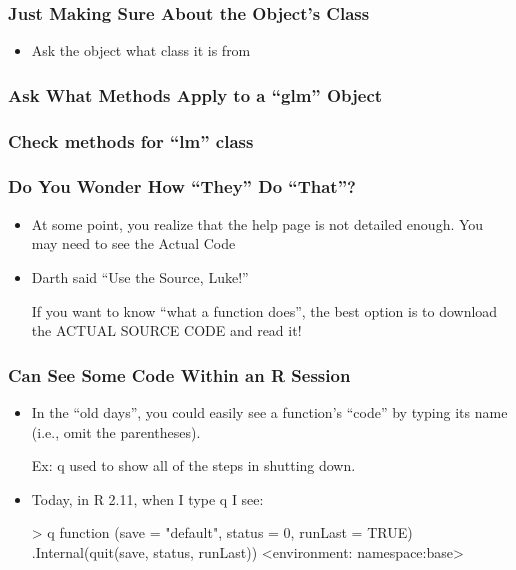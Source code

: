 \documentclass[10pt,english]{beamer}
\begin{document}
\begin{frame}[containsverbatim]
  \frametitle{Just Making Sure About the Object's Class}

  \begin{itemize}
  \item Ask the object what class it is from



  \end{itemize}
\end{frame}


\begin{frame}
  \frametitle{ Ask What Methods Apply to a ``glm'' Object}



\end{frame}



\begin{frame}
  \frametitle{Check methods for ``lm'' class}



\end{frame}




\begin{frame}[containsverbatim]
  \frametitle{Do You Wonder How ``They'' Do ``That''?}
  \begin{itemize}

    \item At some point, you realize that the help page is not
      detailed enough.  You may need to see the Actual Code

    \item Darth said ``Use the Source, Luke!''

      If you want to know ``what a function does'', the
      best option is to download the ACTUAL SOURCE CODE and read it!
    \end{itemize}
\end{frame}


\begin{frame}[containsverbatim]
  \frametitle{Can See Some Code Within an R Session}
  \begin{itemize}
  \item In the ``old days'', you could easily see a function's
      ``code'' by typing its name (i.e., omit the parentheses).

      Ex: q used to show all of the steps in shutting down.

    \item Today, in R 2.11, when I type q I see:

\begin{Schunk}\begin{Soutput}
> q
function (save = "default", status = 0, runLast = TRUE)
.Internal(quit(save, status, runLast))
<environment: namespace:base>
  \end{Soutput}
\end{Schunk}

\end{itemize}
\end{frame}
\end{document}

